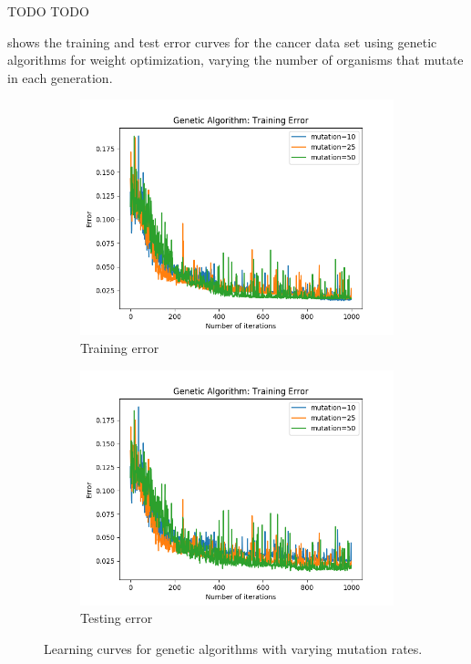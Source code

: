 \documentclass{article}
\begin{document}
        TODO TODO

         shows the training and test error curves for the cancer data set using genetic algorithms for weight optimization, varying the number of organisms that mutate in each generation.

        \begin{figure}[htb]
        \centering

        \begin{subfigure}{0.5\textwidth}
          \includegraphics[width=\linewidth]{out/ga/mutation-training.png}
          \caption{Training error}
          \label{fig:ga-mutation-1}
        \end{subfigure}\hfil
        \begin{subfigure}{0.5\textwidth}
          \includegraphics[width=\linewidth]{out/ga/mutation-testing.png}
          \caption{Testing error}
          \label{fig:ga-mutation-2}
        \end{subfigure}

        \caption{Learning curves for genetic algorithms with varying mutation rates.}
        \label{fig:ga-mutation}
        \end{figure}
\end{document}
